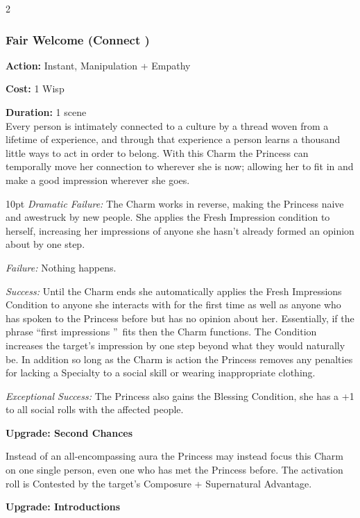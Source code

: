 \begin{multicols}{2}
\subsubsection*{Fair Welcome (Connect \textbullet)}

\noindent \textbf{Action:} Instant, Manipulation + Empathy
	
\noindent \textbf{Cost:} 1 Wisp

\noindent \textbf{Duration:} 1 scene \\

Every person is intimately connected to a culture by a thread woven from a lifetime of experience, and through that experience a person learns a thousand little ways to act in order to belong. With this Charm the Princess can temporally move her connection to wherever she is now; allowing her to fit in and make a good impression wherever she goes. 

\begin{myindentpar}{10pt} \emph{Dramatic Failure:} The Charm works in reverse, making the Princess naive and awestruck by new people. She applies the Fresh Impression condition to herself, increasing her impressions of anyone she hasn't already formed an opinion about by one step. 

    \emph{Failure:} Nothing happens. 

    \emph{Success:} Until the Charm ends she automatically applies the Fresh Impressions Condition to anyone she interacts with for the first time as well as anyone who has spoken to the Princess before but has no opinion about her. Essentially, if the phrase \textquotedblleft first impressions \textquotedblright\, fits then the Charm functions. The Condition increases the target's impression by one step beyond what they would naturally be. In addition so long as the Charm is action the Princess removes any penalties for lacking a Specialty to a social skill or wearing inappropriate clothing. 

    \emph{Exceptional Success:} The Princess also gains the Blessing Condition, she has a +1 to all social rolls with the affected people. 
    
    \textbf{Upgrade: Second Chances}

Instead of an all-encompassing aura the Princess may instead focus this Charm on one single person, even one who has met the Princess before. The activation roll is Contested by the target's Composure + Supernatural Advantage. 

    \textbf{Upgrade: Introductions}
    

\end{myindentpar}
\end{multicols}
